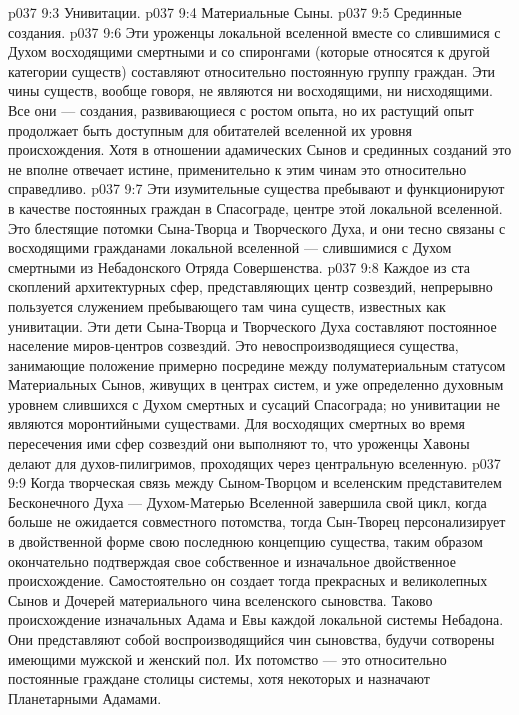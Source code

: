 \vs p037 9:3 \bibnobreakspace Унивитации.
\vs p037 9:4 \bibnobreakspace Материальные Сыны.
\vs p037 9:5 \bibnobreakspace Срединные создания.
\vs p037 9:6 \pc Эти уроженцы локальной вселенной вместе со слившимися с Духом восходящими смертными и со спиронгами (которые относятся к другой категории существ) составляют относительно постоянную группу граждан. Эти чины существ, вообще говоря, не являются ни восходящими, ни нисходящими. Все они --- создания, развивающиеся с ростом опыта, но их растущий опыт продолжает быть доступным для обитателей вселенной их уровня происхождения. Хотя в отношении адамических Сынов и срединных созданий это не вполне отвечает истине, применительно к этим чинам это относительно справедливо.
\vs p037 9:7 \pc {} Эти изумительные существа пребывают и функционируют в качестве постоянных граждан в Спасограде, центре этой локальной вселенной. Это блестящие потомки Сына\hyp{}Творца и Творческого Духа, и они тесно связаны с восходящими гражданами локальной вселенной --- слившимися с Духом смертными из Небадонского Отряда Совершенства.
\vs p037 9:8 \pc {} Каждое из ста скоплений архитектурных сфер, представляющих центр созвездий, непрерывно пользуется служением пребывающего там чина существ, известных как унивитации. Эти дети Сына\hyp{}Творца и Творческого Духа составляют постоянное население миров\hyp{}центров созвездий. Это невоспроизводящиеся существа, занимающие положение примерно посредине между полуматериальным статусом Материальных Сынов, живущих в центрах систем, и уже определенно духовным уровнем слившихся с Духом смертных и сусаций Спасограда; но унивитации не являются моронтийными существами. Для восходящих смертных во время пересечения ими сфер созвездий они выполняют то, что уроженцы Хавоны делают для духов\hyp{}пилигримов, проходящих через центральную вселенную.
\vs p037 9:9 \pc {} Когда творческая связь между Сыном\hyp{}Творцом и вселенским представителем Бесконечного Духа --- Духом\hyp{}Матерью Вселенной завершила свой цикл, когда больше не ожидается совместного потомства, тогда Сын\hyp{}Творец персонализирует в двойственной форме свою последнюю концепцию существа, таким образом окончательно подтверждая свое собственное и изначальное двойственное происхождение. Самостоятельно он создает тогда прекрасных и великолепных Сынов и Дочерей материального чина вселенского сыновства. Таково происхождение изначальных Адама и Евы каждой локальной системы Небадона. Они представляют собой воспроизводящийся чин сыновства, будучи сотворены имеющими мужской и женский пол. Их потомство --- это относительно постоянные граждане столицы системы, хотя некоторых и назначают Планетарными Адамами.
